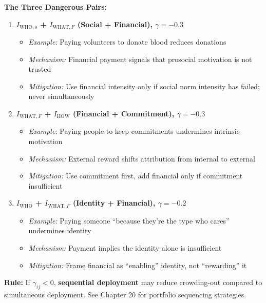 \begin{tcolorbox}[colback=red!5!white, colframe=red!75!black,
    title=\textbf{Critical Crowding-Out Combinations (NEVER combine without mitigation)}]

\textbf{The Three Dangerous Pairs:}

\begin{enumerate}
    \item \textbf{$I_{\text{WHO},o}$ + $I_{\text{WHAT},F}$ (Social + Financial), $\gamma = -0.3$}
    \begin{itemize}[nosep]
        \item \textit{Example:} Paying volunteers to donate blood reduces donations \citep{PAP-gneezy2000fine}
        \item \textit{Mechanism:} Financial payment signals that prosocial motivation is not trusted
        \item \textit{Mitigation:} Use financial intensity only if social norm intensity has failed; never simultaneously
    \end{itemize}

    \item \textbf{$I_{\text{WHAT},F}$ + $I_{\text{HOW}}$ (Financial + Commitment), $\gamma = -0.3$}
    \begin{itemize}[nosep]
        \item \textit{Example:} Paying people to keep commitments undermines intrinsic motivation
        \item \textit{Mechanism:} External reward shifts attribution from internal to external
        \item \textit{Mitigation:} Use commitment first, add financial only if commitment insufficient
    \end{itemize}

    \item \textbf{$I_{\text{WHO}}$ + $I_{\text{WHAT},F}$ (Identity + Financial), $\gamma = -0.2$}
    \begin{itemize}[nosep]
        \item \textit{Example:} Paying someone ``because they're the type who cares'' undermines identity
        \item \textit{Mechanism:} Payment implies the identity alone is insufficient
        \item \textit{Mitigation:} Frame financial as ``enabling'' identity, not ``rewarding'' it
    \end{itemize}
\end{enumerate}

\textbf{Rule:} If $\gamma_{ij} < 0$, \textbf{sequential deployment} may reduce crowding-out compared to simultaneous deployment. See Chapter 20 for portfolio sequencing strategies.

\end{tcolorbox}

